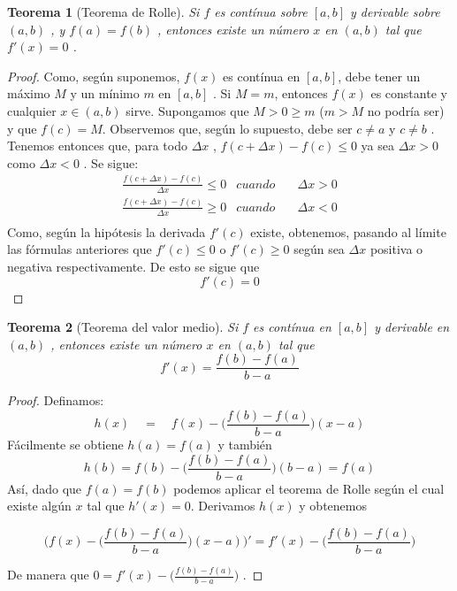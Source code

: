 \documentclass[12pt,a4paper]{extarticle}
\newtheorem{theorem}{Teorema}[section]
\begin{document}
\begin{theorem}[Teorema de Rolle] Si \( f \) es cont\'inua sobre \( [a,b] \) y derivable sobre \( (a,b) \) , y \( f(a) = f(b) \) , entonces existe un n\'umero \( x \)  en \( (a,b) \) tal que \( f'(x)=0 \) .
\end{theorem}
\begin{proof}
Como, seg\'un suponemos, \( f(x) \) es cont\'inua en \( [a,b] \), debe tener un m\'aximo \( M \) y un m\'inimo \( m \)  en \( [a,b] \) .
Si \( M = m  \), entonces \( f(x)  \) es constante y cualquier \( x \in (a,b) \) sirve.
Supongamos que \( M > 0 \geq m \)  (\(  m > M \) no podr\'ia ser) y que \( f(c)=M \). Observemos que, seg\'un lo supuesto, debe ser \( c \neq a \)  y \( c \neq b \) .
Tenemos entonces que, para todo \( \Delta x \) , \( f(c+\Delta x) - f(c) \leq 0 \) ya sea \( \Delta x > 0 \) como \( \Delta x < 0 \) . Se sigue:
{\renewcommand{\arraystretch}{1.8} %
\begin{align*}
&\frac{f(c+\Delta x)-f(c)}{\Delta x} \leq 0 & cuando  & \quad \Delta x > 0 & \\
&\frac{f(c+\Delta x)-f(c)}{\Delta x} \geq 0 & cuando & \quad \Delta x < 0 & \\
\end{align*}}
Como, seg\'un la hip\'otesis la derivada \( f'(c) \) existe, obtenemos, pasando al l\'imite las f\'ormulas anteriores que \(  f'(c) \leq 0 \)  o \(  f'(c) \geq 0 \) seg\'un sea \( \Delta x \) positiva o negativa respectivamente. De esto se sigue que
\[ f'(c)=0 \]
\end{proof}
\begin{theorem}[Teorema del valor medio]
Si \( f \) es cont\'inua en \( [a,b] \) y derivable en \( (a,b) \) , entonces existe un n\'umero \( x \)  en \( (a,b) \) tal que
\[ f'(x)=\frac{f(b)-f(a)}{b-a} \]
\end{theorem}
\begin{proof}
Definamos:
\[ h(x) \quad = \quad f(x) - \Big(\frac{f(b)-f(a)}{b-a} \Big)(x-a) \]
F\'acilmente se obtiene \( h(a)=f(a) \) y tambi\'en
\[ h(b) = f(b) - \Big(\frac{f(b)-f(a)}{b-a}\Big)(b-a) = f(a) \]
As\'i, dado que \( f(a)=f(b) \) podemos aplicar el teorema de Rolle seg\'un el cual existe alg\'un \( x \) tal que
\( h'(x)=0 \). Derivamos \( h(x) \) y obtenemos

\[ \Bigg( f(x) - \Big(\frac{f(b)-f(a)}{b-a} \Big)(x-a) \Bigg)' = f'(x) - \Big(\frac{f(b)-f(a)}{b-a} \Big) \]

De manera que \( 0 = f'(x) - \Big(\frac{f(b)-f(a)}{b-a} \Big)  \) .
\end{proof}
\end{document}
